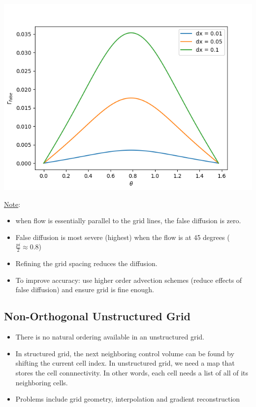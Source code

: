 \documentclass[11pt]{article}
\begin{document}
\begin{center}
\includegraphics[scale=0.8]{../pic/false_diffusion2D.png}
\end{center}
\uline{Note}:
\begin{itemize}
\item when flow is essentially parallel to the grid lines, the false diffusion is zero.
\item False diffusion is most severe (highest) when the flow is at 45 degrees (\(\frac{pi}{2} \approx 0.8\))
\item Refining the grid spacing reduces the diffusion.
\item To improve accuracy: use higher order advection schemes (reduce effects of false diffusion) and ensure
grid is fine enough.
\end{itemize}
\subsection{Non-Orthogonal Unstructured Grid}
\label{sec:org8a1dbd0}
\begin{itemize}
\item There is no natural ordering available in an unstructured grid.
\item In structured grid, the next neighboring control volume can be found by shifting the current cell
index.  In unstructured grid, we need a map that stores the cell connnectivity. In other words, each cell
needs a list of all of its neighboring cells.
\item Problems include grid geometry, interpolation and gradient reconstruction
\end{itemize}
\end{document}
